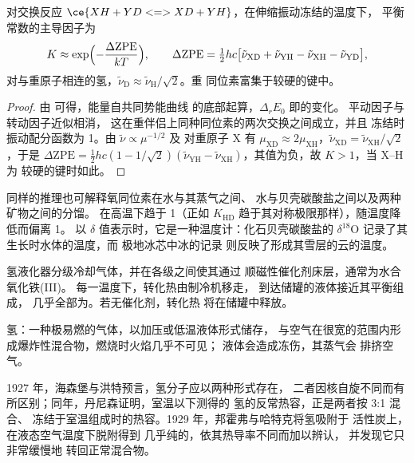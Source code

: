 \begin{proposition}[由零点能导出的同位素效应]\label{prop:b3:statistical-thermo-applied:zpe-isotope}
对交换反应 $\ce{XH + YD <=> XD + YH}$，在伸缩振动冻结的温度下，
平衡常数的主导因子为
\[
  K \approx \exp\Bigl(-\frac{\Delta\mathrm{ZPE}}{kT}\Bigr), \qquad
  \Delta\mathrm{ZPE} = \tfrac12hc\bigl[\tilde\nu_{\mathrm{XD}} + \tilde\nu_{\mathrm{YH}} - \tilde\nu_{\mathrm{XH}} - \tilde\nu_{\mathrm{YD}}\bigr],
\]
对与重原子相连的氢，$\tilde\nu_{\mathrm D} \approx \tilde\nu_{\mathrm H}/\sqrt2$。重
同位素富集于较硬的键中。
\end{proposition}

\begin{proof}
由  可得，能量自共同势能曲线
的底部起算，$\Delta_rE_0$ 即的变化。
平动因子与转动因子近似相消，
这在重伴侣上同种同位素的两次交换之间成立，并且
冻结时振动配分函数为 1。由 $\tilde\nu \propto \mu^{-1/2}$ 及
对重原子 X 有 $\mu_{\mathrm{XD}} \approx 2\mu_{\mathrm{XH}}$，$\tilde\nu_{\mathrm{XD}} = \tilde\nu_{\mathrm{XH}}/\sqrt2$，于是 $\Delta\mathrm{ZPE} =
\frac12hc(1 - 1/\sqrt2)(\tilde\nu_{\mathrm{YH}} - \tilde\nu_{\mathrm{XH}})$，其值为负，故 $K > 1$，当 X--H 为
较硬的键时如此。
\end{proof}

同样的推理也可解释氧同位素在水与其蒸气之间、
水与贝壳碳酸盐之间以及两种矿物之间的分馏。
在高温下趋于 1（正如 $K_{\mathrm{HD}}$
趋于其对称极限那样），随温度降低而偏离 1。
以 $\delta$ 值表示时，它是一种温度计：化石贝壳碳酸盐的 $\delta^{18}$O
记录了其生长时水体的温度，而
极地冰芯中冰的记录
则反映了形成其雪层的云的温度。

\begin{inthelab}[正–仲氢转换器]
氢液化器分级冷却气体，并在各级之间使其通过
顺磁性催化剂床层，通常为水合氧化铁(III)。
每一温度下，转化热由制冷机移走，
到达储罐的液体接近其平衡组成，
几乎全部为。若无催化剂，转化热
将在储罐中释放。
\end{inthelab}

\begin{safety}{}
氢：一种极易燃的气体，以加压或低温液体形式储存，
与空气在很宽的范围内形成爆炸性混合物，燃烧时火焰几乎不可见；
液体会造成冻伤，其蒸气会
排挤空气。
\end{safety}

\begin{history}[两种氢，1927--1929]
1927 年，海森堡与洪特预言，氢分子应以两种形式存在，
二者因核自旋不同而有所区别；同年，丹尼森证明，室温以下测得的
氢的反常热容，正是两者按 3:1 混合、
冻结于室温组成时的热容。1929 年，邦霍弗与哈特克将氢吸附于
活性炭上，在液态空气温度下脱附得到
几乎纯的，依其热导率不同而加以辨认，
并发现它只非常缓慢地
转回正常混合物。
\end{history}

